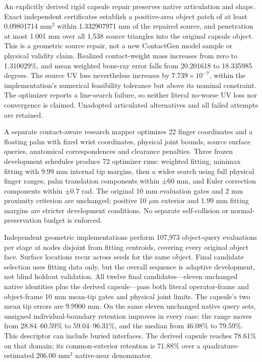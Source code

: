 \documentclass[10pt,letterpaper]{article}
\begin{document}
An explicitly derived rigid capsule repair preserves native articulation and
shape. Exact independent certificates establish a positive-area object patch
of at least 0.09801714 $\mathrm{mm}^2$ within 1.332907971 mm of the repaired
source, and penetration at most 1.001 mm over all 1,538 source triangles into
the original capsule object. This is a geometric source repair, not a new
ContactGen model sample or physical validity claim. Realized contact-weight
mass increases from zero to 1.310029\%, and mean weighted bone-ray error falls
from 20.201618 to 18.335985 degrees. The source UV loss nevertheless increases
by $7.739\times10^{-7}$, within the implementation's numerical feasibility
tolerance but above its nominal constraint. The optimizer reports a line-search
failure, so neither literal no-worse UV loss nor convergence is claimed.
Unadopted articulated alternatives and all failed attempts are retained.

A separate contact-aware research mapper optimizes 22 finger coordinates and
a floating palm with fixed wrist coordinates, physical joint bounds, source
surface queries, anatomical correspondences and clearance penalties. Three
frozen development schedules produce 72 optimizer runs: weighted fitting,
minimax fitting with 9.99 mm internal tip margins, then a wider search using
full physical finger ranges, palm translation components within $\pm60$ mm,
and Euler correction components within $\pm0.7$ rad.
The original 10 mm evaluation gates and 2 mm proximity criterion are unchanged;
positive 10 $\mu$m exterior and 1.99 mm fitting margins are stricter development
conditions. No separate self-collision or normal-preservation budget is enforced.

Independent geometric implementations perform 107,973 object-query evaluations
per stage at nodes disjoint from fitting centroids, covering every original
object face. Surface locations recur across seeds for the same object. Final candidate selection uses
fitting data only, but the overall sequence is adaptive development, not blind
holdout validation. All twelve final candidates---eleven unchanged native
identities plus the derived capsule---pass both literal operator-frame and
object-frame 10 mm mean-tip gates and physical joint limits. The capsule's two
mean tip errors are 9.9900 mm. On the same eleven unchanged native query sets,
unsigned individual-boundary retention improves in every case: the range moves
from 28.84--60.59\% to 59.04--96.31\%, and the median from 46.08\% to 79.59\%.
This descriptor can include buried interfaces. The derived capsule reaches
78.61\% on that domain; its common-exterior retention is 71.88\% over a
quadrature-estimated 206.00 $\mathrm{mm}^2$ native-near denominator.
\end{document}

